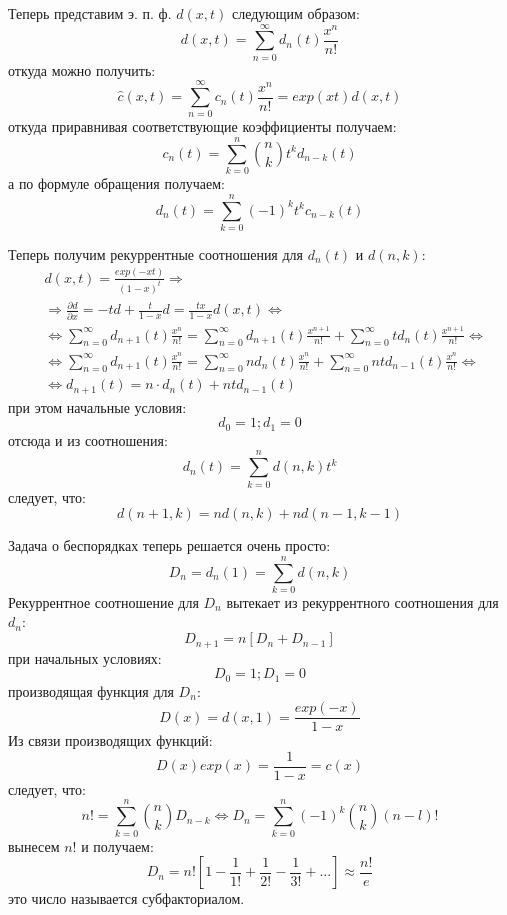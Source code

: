 Теперь представим э. п. ф. $d\left(x,t\right)$ следующим образом:
\[
	d\left(x,t\right) = \sum_{n=0}^{\infty} d_n\left(t\right)\frac{x^n}{n!}
\]
откуда можно получить:
\[
	\hat c\left(x,t\right) = \sum_{n=0}^{\infty} c_n\left(t\right)\frac{x^n}{n!} = exp\left(xt\right)d\left(x,t\right)
\]
откуда приравнивая соответствующие коэффициенты получаем:
\[
	c_n\left(t\right) = \sum_{k=0}^n \binom{n}{k} t^k d_{n-k}\left(t\right)
\]
а по формуле обращения получаем:
\[
	d_n\left(t\right) = \sum_{k=0}^n \left(-1\right)^kt^kc_{n-k}\left(t\right)
\]

Теперь получим рекуррентные соотношения для $d_n\left(t\right)$ и $d\left(n,k\right)$:
\[
	\begin{split}
		&d\left(x,t\right) = \frac{exp\left(-xt\right)}{\left(1-x\right)^t} \Rightarrow \\
		&\Rightarrow \frac{\partial d}{\partial x} = -td + \frac{t}{1-x}d = \frac{tx}{1-x}d\left(x,t\right) \Leftrightarrow \\
		&\Leftrightarrow \sum_{n=0}^{\infty}d_{n+1}\left(t\right) \frac{x^n}{n!} = \sum_{n=0}^{\infty}d_{n+1}\left(t\right)\frac{x^{n+1}}{n!} + \sum_{n=0}^{\infty} td_n\left(t\right) \frac{x^{n+1}}{n!} \Leftrightarrow\\
		&\Leftrightarrow \sum_{n=0}^{\infty}d_{n+1}\left(t\right)\frac{x^n}{n!} = \sum_{n=0}^{\infty}nd_n\left(t\right)\frac{x^n}{n!} + \sum_{n=0}^{\infty}ntd_{n-1}\left(t\right)\frac{x^n}{n!} \Leftrightarrow\\
		&\Leftrightarrow d_{n+1} \left(t\right) = n\cdot d_n\left(t\right) + nt d_{n-1}\left(t\right)
	\end{split}
\]
при этом начальные условия:
\[
	d_0 = 1; d_1 = 0
\]
отсюда и из соотношения:
\[
	d_n\left(t\right) = \sum_{k=0}^n d\left(n,k\right) t^k
\]
следует, что:
\[
	d\left(n+1,k\right) = nd\left(n,k\right) + nd\left(n-1,k-1\right)
\]

Задача о беспорядках теперь решается очень просто:
\[
	D_n = d_n\left(1\right) = \sum_{k=0}^nd\left(n,k\right)
\]
Рекуррентное соотношение для $D_n$ вытекает из рекуррентного соотношения для $d_n$:
\[
	D_{n+1} = n\left[D_n + D_{n-1}\right]
\]
при начальных условиях:
\[
	D_0 = 1; D_1 = 0
\]
производящая функция для $D_n$:
\[
	D\left(x\right) = d\left(x,1\right) = \frac{exp\left(-x\right)}{1-x}
\]
Из связи производящих функций:
\[
	D\left(x\right) exp\left(x\right) = \frac{1}{1-x} = c\left(x\right)
\]
следует, что:
\[
	n! = \sum_{k=0}^n \binom{n}{k}D_{n-k} \Leftrightarrow D_n = \sum_{k=0}^n \left(-1\right)^k \binom{n}{k} \left(n-l\right)!
\]
вынесем $n!$ и получаем:
\[
	D_n = n! \left[1 - \frac{1}{1!} + \frac{1}{2!} - \frac{1}{3!} + ...\right] \approx \frac{n!}{e}
\]
это число называется субфакториалом.

